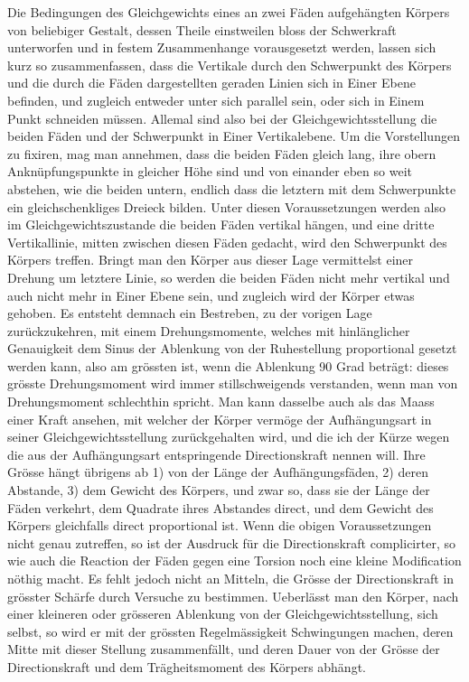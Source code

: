 Die Bedingungen des Gleichgewichts eines an zwei Fäden aufgehängten Körpers von beliebiger Gestalt, dessen Theile einstweilen bloss der Schwerkraft unterworfen und in festem Zusammenhange vorausgesetzt werden, lassen sich kurz so zusammenfassen, dass die Vertikale durch den Schwerpunkt des Körpers und die durch die Fäden dargestellten geraden Linien sich in Einer Ebene befinden, und zugleich entweder unter sich parallel sein, oder sich in Einem Punkt schneiden müssen. Allemal sind also bei der Gleichgewichtsstellung die beiden Fäden und der Schwerpunkt in Einer Vertikalebene. Um die Vorstellungen zu fixiren, mag man annehmen, dass die beiden Fäden gleich lang, ihre obern Anknüpfungspunkte in gleicher Höhe sind und von einander eben so weit abstehen, wie die beiden untern, endlich dass die letztern mit dem Schwerpunkte ein gleichschenkliges Dreieck bilden. Unter diesen Voraussetzungen werden also im Gleichgewichtszustande die beiden Fäden vertikal hängen, und eine dritte Vertikallinie, mitten zwischen diesen Fäden gedacht, wird den Schwerpunkt des Körpers treffen. Bringt man den Körper aus dieser Lage vermittelst einer Drehung um letztere Linie, so werden die beiden Fäden nicht mehr vertikal und auch nicht mehr in Einer Ebene sein, und zugleich wird der Körper etwas gehoben. Es entsteht demnach ein Bestreben, zu der vorigen Lage zurückzukehren, mit einem Drehungsmomente, welches mit hinlänglicher Genauigkeit dem Sinus der Ablenkung von der Ruhestellung proportional gesetzt werden kann, also am grössten ist, wenn die Ablenkung 90 Grad beträgt: dieses grösste Drehungsmoment wird immer stillschweigends verstanden, wenn man von Drehungsmoment schlechthin spricht. Man kann dasselbe auch als das Maass einer Kraft ansehen, mit welcher der Körper vermöge der Aufhängungsart in seiner Gleichgewichtsstellung zurückgehalten wird, und die ich der Kürze wegen die aus der Aufhängungsart entspringende Directionskraft nennen will. Ihre Grösse hängt übrigens ab 1) von der Länge der Aufhängungsfäden, 2) deren Abstande, 3) dem Gewicht des Körpers, und zwar so, dass sie der Länge der Fäden verkehrt, dem Quadrate ihres Abstandes direct, und dem Gewicht des Körpers gleichfalls direct proportional ist. Wenn die obigen Voraussetzungen nicht genau zutreffen, so ist der Ausdruck für die Directionskraft complicirter, so wie auch die Reaction der Fäden gegen eine Torsion noch eine kleine Modification nöthig macht. Es fehlt jedoch nicht an Mitteln, die Grösse der Directionskraft in grösster Schärfe durch Versuche zu bestimmen. Ueberlässt man den Körper, nach einer kleineren oder grösseren Ablenkung von der Gleichgewichtsstellung, sich selbst, so wird er mit der grössten Regelmässigkeit Schwingungen machen, deren Mitte mit dieser Stellung zusammenfällt, und deren Dauer von der Grösse der Directionskraft und dem Trägheitsmoment des Körpers abhängt.

